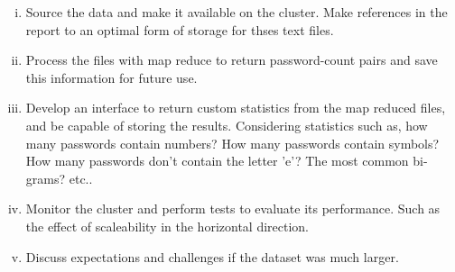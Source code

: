 \documentclass{article}
\begin{document}
\begin{multicols}{2}
{\begin{enumerate}[(i)]

\item Source the data and make it available on the cluster. Make references in the report to an optimal form of storage for thses text files.
\item Process the files with map reduce to return password-count pairs and save this information for future use.
\item Develop an interface to return custom statistics from the map reduced files, and be capable of storing the results. Considering statistics such as, how many passwords contain numbers? How many passwords contain symbols? How many passwords don't contain the letter 'e'? The most common bi-grams? etc..
\item Monitor the cluster and perform tests to evaluate its performance. Such as the effect of scaleability in the horizontal direction.
\item Discuss expectations and challenges if the dataset was much larger.

\end{enumerate}
}



\printbibliography

\end{multicols}
\end{document}
